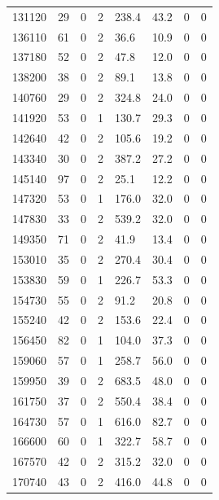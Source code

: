 \documentclass[preview]{standalone}
\begin{document}
{{{{\begin{tabular}{L{1.2cm}C{1.2cm} C{0.3cm}C{0.5cm} C{1.4cm}C{1.4cm} C{1.4cm}C{1.4cm}}
  131120  &    29  & 0     &  2 &  238.4  & 43.2  & 0 &  0   \\ 
  136110  &    61  & 0     &  2 &  36.6  & 10.9  & 0 &  0   \\ 
  137180  &    52  & 0     &  2 &  47.8  & 12.0  & 0 &  0   \\ 
  138200  &    38  & 0     &  2 &  89.1  & 13.8  & 0 &  0   \\ 
  140760  &    29  & 0     &  2 &  324.8  & 24.0  & 0 &  0   \\ 
  141920  &    53  & 0     &  1 &  130.7  & 29.3  & 0 &  0   \\ 
  142640  &    42  & 0     &  2 &  105.6  & 19.2  & 0 &  0   \\ 
  143340  &    30  & 0     &  2 &  387.2  & 27.2  & 0 &  0   \\ 
  145140  &    97  & 0     &  2 &  25.1  & 12.2  & 0 &  0   \\ 
  147320  &    53  & 0     &  1 &  176.0  & 32.0  & 0 &  0   \\ 
  147830  &    33  & 0     &  2 &  539.2  & 32.0  & 0 &  0   \\ 
  149350  &    71  & 0     &  2 &  41.9  & 13.4  & 0 &  0   \\ 
  153010  &    35  & 0     &  2 &  270.4  & 30.4  & 0 &  0   \\ 
  153830  &    59  & 0     &  1 &  226.7  & 53.3  & 0 &  0   \\ 
  154730  &    55  & 0     &  2 &  91.2  & 20.8  & 0 &  0   \\ 
  155240  &    42  & 0     &  2 &  153.6  & 22.4  & 0 &  0   \\ 
  156450  &    82  & 0     &  1 &  104.0  & 37.3  & 0 &  0   \\ 
  159060  &    57  & 0     &  1 &  258.7  & 56.0  & 0 &  0   \\ 
  159950  &    39  & 0     &  2 &  683.5  & 48.0  & 0 &  0   \\ 
  161750  &    37  & 0     &  2 &  550.4  & 38.4  & 0 &  0   \\ 
  164730  &    57  & 0     &  1 &  616.0  & 82.7  & 0 &  0   \\ 
  166600  &    60  & 0     &  1 &  322.7  & 58.7  & 0 &  0   \\ 
  167570  &    42  & 0     &  2 &  315.2  & 32.0  & 0 &  0   \\ 
  170740  &    43  & 0     &  2 &  416.0  & 44.8  & 0 &  0   \\ 
\hline 
\end{tabular} 

}}}}
\end{document}
